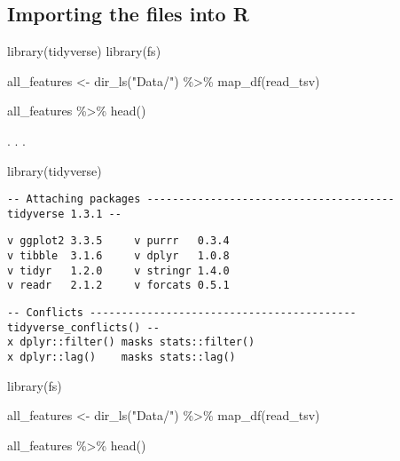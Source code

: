 \documentclass[
  letterpaper,
]{scrbook}
\newenvironment{Shaded}{\begin{snugshade}}{\end{snugshade}}
\newcommand{\FunctionTok}[1]{\textcolor[rgb]{0.28,0.35,0.67}{#1}}
\newcommand{\NormalTok}[1]{\textcolor[rgb]{0.00,0.46,0.62}{#1}}
\newcommand{\OtherTok}[1]{\textcolor[rgb]{0.00,0.46,0.62}{#1}}
\newcommand{\SpecialCharTok}[1]{\textcolor[rgb]{0.37,0.37,0.37}{#1}}
\newcommand{\StringTok}[1]{\textcolor[rgb]{0.13,0.47,0.30}{#1}}
\begin{document}
\hypertarget{importing-the-files-into-r}{%
\subsection*{Importing the files into
R}\label{importing-the-files-into-r}}

\begin{Shaded}
\begin{Highlighting}[]
\FunctionTok{library}\NormalTok{(tidyverse)}
\FunctionTok{library}\NormalTok{(fs)}

\NormalTok{all\_features }\OtherTok{\textless{}{-}} \FunctionTok{dir\_ls}\NormalTok{(}\StringTok{"Data/"}\NormalTok{) }\SpecialCharTok{\%\textgreater{}\%} 
  \FunctionTok{map\_df}\NormalTok{(read\_tsv)}

\NormalTok{all\_features }\SpecialCharTok{\%\textgreater{}\%} 
  \FunctionTok{head}\NormalTok{()}
\end{Highlighting}
\end{Shaded}

. . .

\begin{Shaded}
\begin{Highlighting}[]
\FunctionTok{library}\NormalTok{(tidyverse)}
\end{Highlighting}
\end{Shaded}

\begin{verbatim}
-- Attaching packages --------------------------------------- tidyverse 1.3.1 --
\end{verbatim}

\begin{verbatim}
v ggplot2 3.3.5     v purrr   0.3.4
v tibble  3.1.6     v dplyr   1.0.8
v tidyr   1.2.0     v stringr 1.4.0
v readr   2.1.2     v forcats 0.5.1
\end{verbatim}

\begin{verbatim}
-- Conflicts ------------------------------------------ tidyverse_conflicts() --
x dplyr::filter() masks stats::filter()
x dplyr::lag()    masks stats::lag()
\end{verbatim}

\begin{Shaded}
\begin{Highlighting}[]
\FunctionTok{library}\NormalTok{(fs)}

\NormalTok{all\_features }\OtherTok{\textless{}{-}} \FunctionTok{dir\_ls}\NormalTok{(}\StringTok{"Data/"}\NormalTok{) }\SpecialCharTok{\%\textgreater{}\%} 
  \FunctionTok{map\_df}\NormalTok{(read\_tsv)}

\NormalTok{all\_features }\SpecialCharTok{\%\textgreater{}\%} 
  \FunctionTok{head}\NormalTok{()}
\end{Highlighting}
\end{Shaded}
\end{document}
